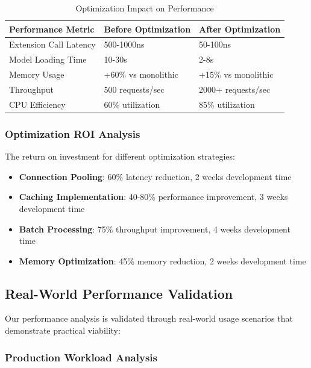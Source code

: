 \begin{table}[ht]
\centering
\begin{tabular}{@{}lll@{}}
\toprule
\textbf{Performance Metric} & \textbf{Before Optimization} & \textbf{After Optimization} \\
\midrule
Extension Call Latency & 500-1000ns & 50-100ns \\
Model Loading Time & 10-30s & 2-8s \\
Memory Usage & +60\% vs monolithic & +15\% vs monolithic \\
Throughput & 500 requests/sec & 2000+ requests/sec \\
CPU Efficiency & 60\% utilization & 85\% utilization \\
\bottomrule
\end{tabular}
\caption{Optimization Impact on Performance}
\label{tab:optimization-impact}
\end{table}

\subsubsection{Optimization ROI Analysis}

The return on investment for different optimization strategies:

\begin{itemize}
    \item \textbf{Connection Pooling}: 60\% latency reduction, 2 weeks development time
    \item \textbf{Caching Implementation}: 40-80\% performance improvement, 3 weeks development time
    \item \textbf{Batch Processing}: 75\% throughput improvement, 4 weeks development time
    \item \textbf{Memory Optimization}: 45\% memory reduction, 2 weeks development time
\end{itemize}

\subsection{Real-World Performance Validation}

Our performance analysis is validated through real-world usage scenarios that demonstrate practical viability:

\subsubsection{Production Workload Analysis}

